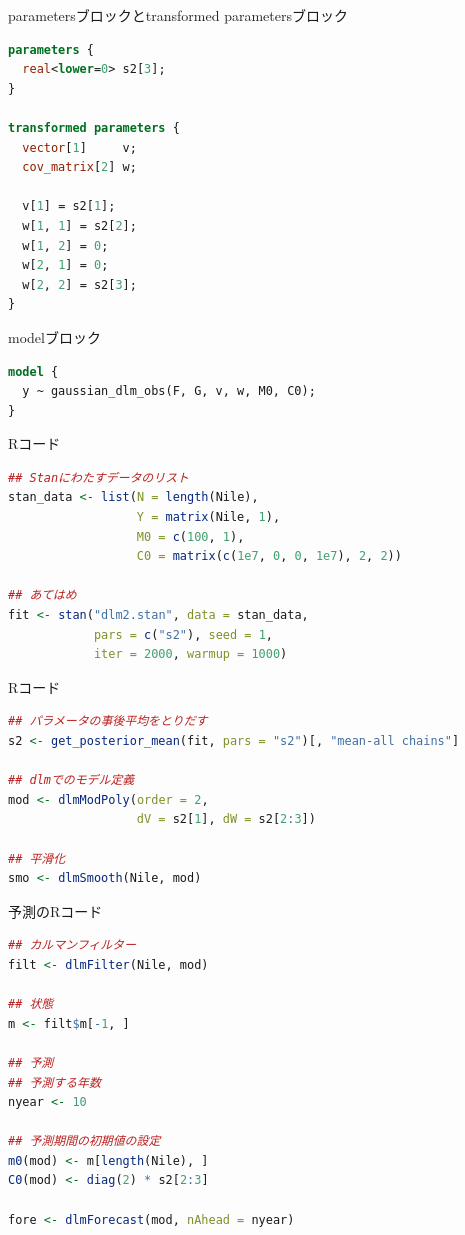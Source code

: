 \documentclass[dvipdfmx,12pt]{beamer}
\begin{document}
\begin{frame}[fragile]{parametersブロックとtransformed parametersブロック}
  \begin{lstlisting}[language=Stan]
parameters {
  real<lower=0> s2[3];
}

transformed parameters {
  vector[1]     v;
  cov_matrix[2] w;

  v[1] = s2[1];
  w[1, 1] = s2[2];
  w[1, 2] = 0;
  w[2, 1] = 0;
  w[2, 2] = s2[3];
}
  \end{lstlisting}
\end{frame}

\begin{frame}[fragile]{modelブロック}
  \begin{lstlisting}[language=Stan]
model {
  y ~ gaussian_dlm_obs(F, G, v, w, M0, C0);
}
  \end{lstlisting}
\end{frame}

\begin{frame}[fragile]{Rコード}
  \begin{lstlisting}[language=R]
## Stanにわたすデータのリスト
stan_data <- list(N = length(Nile),
                  Y = matrix(Nile, 1),
                  M0 = c(100, 1),
                  C0 = matrix(c(1e7, 0, 0, 1e7), 2, 2))

## あてはめ
fit <- stan("dlm2.stan", data = stan_data,
            pars = c("s2"), seed = 1,
            iter = 2000, warmup = 1000)
  \end{lstlisting}
\end{frame}

\begin{frame}[fragile]{Rコード}
  \begin{lstlisting}[language=R]
## パラメータの事後平均をとりだす
s2 <- get_posterior_mean(fit, pars = "s2")[, "mean-all chains"]

## dlmでのモデル定義
mod <- dlmModPoly(order = 2,
                  dV = s2[1], dW = s2[2:3])

## 平滑化
smo <- dlmSmooth(Nile, mod)
  \end{lstlisting}
\end{frame}

\begin{frame}[fragile]{予測のRコード}
  \begin{lstlisting}[language=R]
## カルマンフィルター
filt <- dlmFilter(Nile, mod)

## 状態
m <- filt$m[-1, ]

## 予測
## 予測する年数
nyear <- 10

## 予測期間の初期値の設定
m0(mod) <- m[length(Nile), ]
C0(mod) <- diag(2) * s2[2:3]

fore <- dlmForecast(mod, nAhead = nyear)
  \end{lstlisting}
\end{frame}
\end{document}
